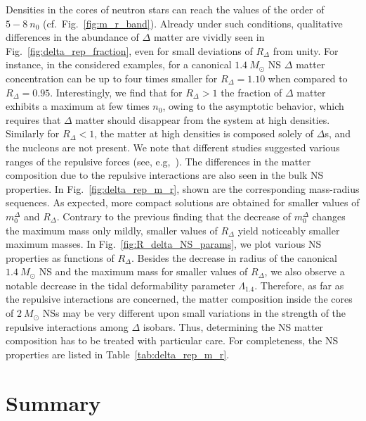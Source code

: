 \documentclass[preprint,showkeys,lengthcheck,nofootinbib,twocolumn,notitlepage,floatfix,superscriptaddress]{revtex4-1}
\begin{document}
Densities in the cores of neutron stars can reach the values of the order of $5-8~n_0$ (cf.~Fig.~\ref{fig:m_r_band}). Already under such conditions, qualitative differences in the abundance of $\Delta$ matter are vividly seen in Fig.~\ref{fig:delta_rep_fraction}, even for small deviations of $R_\Delta$ from unity. For instance, in the considered examples, for a canonical $1.4~M_\odot$ NS $\Delta$ matter concentration can be up to four times smaller for $R_\Delta=1.10$ when compared to $R_\Delta=0.95$. Interestingly, we find that for $R_\Delta>1$ the fraction of $\Delta$ matter exhibits a maximum at few times $n_0$, owing to the asymptotic behavior, which requires that $\Delta$ matter should disappear from the system at high densities. Similarly for $R_\Delta<1$, the matter at high densities is composed solely of $\Delta$s, and the nucleons are not present. We note that different studies suggested various ranges of the repulsive forces (see, e.g,~\cite{Maslov:2015msa, Drago:2014oja}). The differences in the matter composition due to the repulsive interactions are also seen in the bulk NS properties. In Fig.~\ref{fig:delta_rep_m_r}, shown are the corresponding mass-radius sequences. As expected, more compact solutions are obtained for smaller values of $m_0^\Delta$ and $R_\Delta$. Contrary to the previous finding that the decrease of $m_0^\Delta$ changes the maximum mass only mildly, smaller values of $R_\Delta$ yield noticeably smaller maximum masses. In Fig.~\ref{fig:R_delta_NS_params}, we plot various NS properties as functions of $R_\Delta$. Besides the decrease in radius of the canonical $1.4~M_\odot$ NS and the maximum mass for smaller values of $R_\Delta$, we also observe a notable decrease in the tidal deformability parameter $\Lambda_{1.4}$.  Therefore, as far as the repulsive interactions are concerned, the matter composition inside the cores of $2~M_\odot$ NSs may be very  different upon small variations in the strength of the repulsive interactions among $\Delta$ isobars. Thus, determining the NS matter composition has to be treated with particular care. For completeness, the NS properties are listed in Table~\ref{tab:delta_rep_m_r}.

\section{Summary}
\label{sec:summary}
\end{document}
